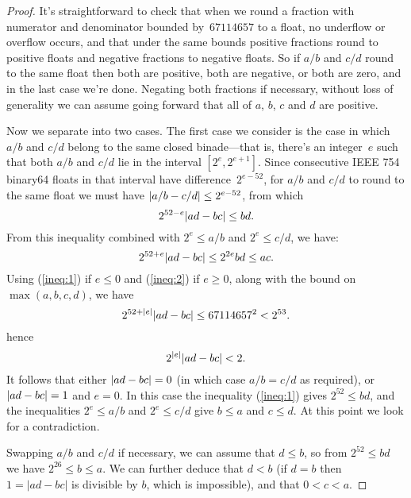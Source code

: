 \documentclass[a4paper]{article}
\DeclarePairedDelimiter\abs{\lvert}{\rvert}
\theoremstyle{plain}
\begin{document}
\begin{proof}
    It's straightforward to check that when we round a fraction with numerator
    and denominator bounded by~$67114657$ to a float, no underflow or overflow
    occurs, and that under the same bounds positive fractions round to positive
    floats and negative fractions to negative floats. So if $a/b$ and $c/d$
    round to the same float then both are positive, both are negative, or both
    are zero, and in the last case we're done. Negating both fractions if
    necessary, without loss of generality we can assume going forward that all
    of $a$, $b$, $c$ and $d$ are positive.

    Now we separate into two cases. The first case we consider is the case in
    which $a/b$ and $c/d$ belong to the same closed binade---that is, there's
    an integer~$e$ such that both $a/b$ and $c/d$ lie in the interval $[2^e,
    2^{e+1}]$.
    Since consecutive IEEE 754 binary64 floats in that interval have
    difference~$2^{e-52}$, for $a/b$ and $c/d$ to round to the same float we
    must have
    $\abs{a/b - c/d} \le 2^{e-52}$, from which
    \begin{equation}
        2^{52-e}\abs{ad - bc} \le bd.\label{ineq:1}
    \end{equation}
    From this inequality combined with $2^e \le a/b$ and $2^e \le c/d$, we
    have:
    \begin{equation}
        2^{52+e}\abs{ad - bc} \le 2^{2e}bd \le ac  .\label{ineq:2}
    \end{equation}
    Using (\ref{ineq:1}) if $e \le 0$ and (\ref{ineq:2}) if $e \ge 0$, along
    with the bound on~$\max(a, b, c, d)$, we have
    \begin{equation}
        2^{52 + \abs{e}}\abs{ad - bc} \le 67114657^2 < 2^{53}.\label{ineq:3}
    \end{equation}
    hence
    \begin{equation}
        2^{\abs{e}}\abs{ad - bc} < 2.\label{ineq:4}
    \end{equation}
    It follows that either $\abs{ad - bc} = 0$ (in which case $a/b = c/d$ as
    required), or $\abs{ad - bc} = 1$ and $e = 0$. In this case the inequality
    (\ref{ineq:1}) gives $2^{52} \le bd$, and the inequalities $2^e \le a/b$
    and $2^e \le c/d$ give $b \le a$ and $c \le d$. At this point we look for
    a contradiction.

    Swapping $a/b$ and $c/d$ if necessary, we can assume that $d \le b$, so
    from $2^{52} \le bd$ we have $2^{26} \le b \le a$. We can further deduce
    that $d < b$ (if $d = b$ then $1 = |ad - bc|$ is divisible by $b$, which
    is impossible), and that $0 < c < a$.


\end{proof}
\end{document}
